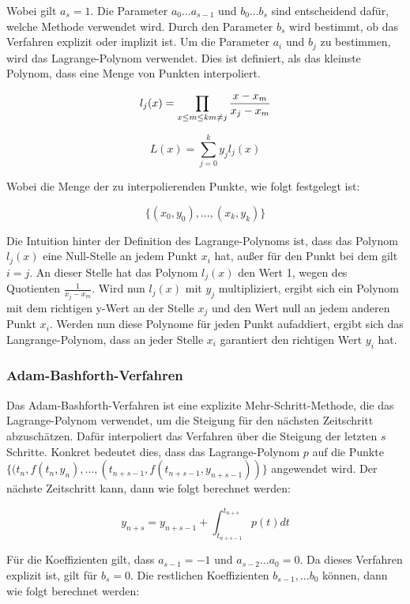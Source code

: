 Wobei gilt $a_s = 1$.  Die Parameter $a_0 ... a_{s-1}$ und $b_0 ... b_{s}$ sind entscheidend dafür, welche Methode verwendet wird.
Durch den Parameter $b_s$ wird bestimmt, ob das Verfahren explizit oder
implizit ist.
Um die Parameter $a_i$ und $b_j$ zu bestimmen, wird das Lagrange-Polynom \cite[Kapitel~3.1.2]{numerisch_langrange} verwendet.
Dies ist definiert, als das kleinste Polynom, dass eine Menge von Punkten interpoliert.

$$
l_j(x) = \prod_{x \leq m \leq k \\ m \neq j} \frac{x - x_m}{x_j - x_m}
$$

$$
L(x) = \sum_{j = 0}^{k} y_j l_j(x)
$$

Wobei die Menge der zu interpolierenden Punkte, wie folgt festgelegt ist:

$$
\{(x_0, y_0), ..., (x_k, y_k)\}
$$

Die Intuition hinter der Definition des Lagrange-Polynoms ist, 
dass das Polynom $l_j(x)$ eine Null-Stelle an jedem Punkt $x_i$ hat, außer für den Punkt bei dem gilt $i = j$. 
An dieser Stelle hat das Polynom $l_j(x)$ den Wert 1, wegen des Quotienten $\frac{1}{x_j - x_m}$.
Wird nun $l_j(x)$ mit $y_j$ multipliziert, ergibt sich ein Polynom mit dem richtigen y-Wert an der Stelle $x_j$ und den Wert null an jedem anderen Punkt $x_i$.
Werden nun diese Polynome für jeden Punkt aufaddiert,
ergibt sich das Langrange-Polynom, dass an jeder Stelle $x_i$ garantiert den richtigen Wert $y_i$ hat.


\subsubsection{Adam-Bashforth-Verfahren} \label{sec:adam-bashforth}

Das Adam-Bashforth-Verfahren ist eine explizite Mehr-Schritt-Methode, 
die das Lagrange-Polynom verwendet, 
um die Steigung für den nächsten Zeitschritt abzuschätzen. 
Dafür interpoliert das Verfahren über die Steigung der letzten $s$ Schritte.
Konkret bedeutet dies, dass das Lagrange-Polynom $p$ auf die Punkte $\{(t_{n}, f(t_{n}, y_{n}), ..., (t_{n + s - 1}, f(t_{n + s - 1}, y_{n + s - 1}))\}$ angewendet wird.
Der nächste Zeitschritt kann, dann wie folgt berechnet werden:

$$
y_{n + s} = y_{n + s -1} + \int_{t_{n+s-1}}^{t_{n + s}} p(t) dt
$$

Für die Koeffizienten gilt, dass $a_{s-1} = -1$ und $a_{s-2} ... a_{0} = 0$. 
Da dieses Verfahren explizit ist, gilt für $b_s = 0$. Die restlichen Koeffizienten $b_{s-1}, ... b_{0}$
können, dann wie folgt berechnet werden:

